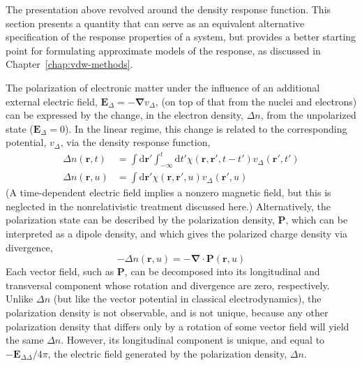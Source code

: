 The presentation above revolved around the density response function.
This section presents a quantity that can serve as an equivalent alternative specification of the response properties of a system, but provides a better starting point for formulating approximate models of the response, as discussed in Chapter~\ref{chap:vdw-methods}.

The polarization of electronic matter under the influence of an additional external electric field, $\mathbf E_\Delta=-\boldsymbol\nabla v_\Delta$, (on top of that from the nuclei and electrons) can be expressed by the change, in the electron density, $\Delta n$, from the unpolarized state ($\mathbf E_\Delta=0$).
In the linear regime, this change is related to the corresponding potential, $v_\Delta$, via the density response function,
\begin{align}
  \Delta n(\mathbf r,t)&=\int\mathrm d\mathbf r'\int_{-\infty}^t\mathrm dt'\chi(\mathbf r,\mathbf r',t-t')v_\Delta(\mathbf r',t') \\
  \Delta n(\mathbf r,u)&=\int\mathrm d\mathbf r'\chi(\mathbf r,\mathbf r',u)v_\Delta(\mathbf r',u)
  \label{eq:polarization}
\end{align}
(A time-dependent electric field implies a nonzero magnetic field, but this is neglected in the nonrelativistic treatment discussed here.)
Alternatively, the polarization state can be described by the polarization density, $\mathbf P$, which can be interpreted as a dipole density, and which gives the polarized charge density via divergence,
\begin{equation}
  -\Delta n(\mathbf r,u)=-\boldsymbol\nabla\cdot\mathbf P(\mathbf r,u)
\end{equation}
Each vector field, such as $\mathbf P$, can be decomposed into its longitudinal and transversal component whose rotation and divergence are zero, respectively.
Unlike $\Delta n$ (but like the vector potential in classical electrodynamics), the polarization density is not observable, and is not unique, because any other polarization density that differs only by a rotation of some vector field will yield the same $\Delta n$.
However, its longitudinal component is unique, and equal to $-\mathbf E_{\Delta\Delta}/4\pi$, the electric field generated by the polarization density, $\Delta n$.

